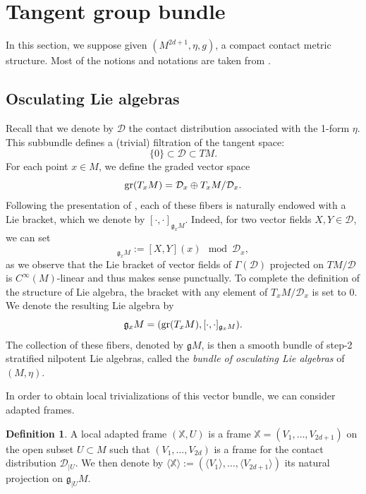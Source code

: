 \documentclass[12pt,a4paper]{amsart}
\theoremstyle{plain}
\theoremstyle{definition}
\newtheorem{definition}[theorem]{Definition}
\theoremstyle{remark}
\numberwithin{equation}{section}
\theoremstyle{definition}
\def \cD{\mathcal{D}}
\def \bX{\mathbb{X}}
\def \fg{\mathfrak{g}}
\numberwithin{equation}{section}
\begin{document}
\section{Tangent group bundle}
\label{sect:tanggroupbundle}

In this section, we suppose given $(M^{2d+1},\eta,g)$, a compact contact metric structure. Most of the notions and notations are taken from \cite{FFF24}.

\subsection{Osculating Lie algebras}

Recall that we denote by $\cD$ the contact distribution associated with the 1-form $\eta$. This subbundle defines a (trivial) filtration of the tangent space:
\begin{equation*}
\{0\}\subset \cD\subset TM.
\end{equation*}
For each point $x\in M$, we define the graded vector space
\begin{equation*}
 {\rm gr}(T_x M) = \cD_x \oplus T_x M/ \cD_x.
\end{equation*}
Following the presentation of \cite[Section 3.1]{FFF24}, each of these fibers is naturally endowed with a Lie bracket, which we denote by $[\cdot,\cdot]_{\fg_x M}$. Indeed, for 
two vector fields $X,Y \in \cD$, we can set
\begin{equation*}
 [X_x,Y_x]_{\fg_x M} := [X,Y](x) \mod \cD_x,
\end{equation*}
as we observe that the Lie bracket of vector fields of $\Gamma(\cD)$ projected on $TM/\cD$ is $C^\infty(M)$-linear and thus makes sense punctually.
To complete the definition of the structure of Lie algebra, the bracket with any element of $T_x M/\cD_x$ is set to 0. 
We denote the resulting Lie algebra by 
\begin{equation*}
 \fg_x M = ({\rm gr}(T_x M),[\cdot,\cdot]_{\fg_x M}).
\end{equation*}
The collection of these fibers, denoted by $\fg M$, is then a smooth bundle of step-2 stratified nilpotent Lie algebras, called the \emph{bundle of osculating Lie algebras} of $(M,\eta)$. 

In order to obtain local trivializations of this vector bundle, we can consider adapted frames.

\begin{definition}
    A local adapted frame $(\bX,U)$ is a frame $\bX = (V_1,\dots,V_{2d+1})$ on the open subset $U\subset M$ such that $(V_1,\dots,V_{2d})$ is a frame for the contact distribution $\cD_{|U}$. We then denote by $\langle \bX\rangle := (\langle V_1\rangle,\dots,\langle V_{2d+1}\rangle)$ its natural projection on $\mathfrak{g}_{|U}M$.
\end{definition}
\end{document}
